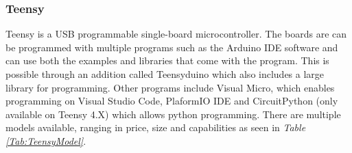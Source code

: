 \subsubsection{Teensy}

Teensy is a USB programmable single-board microcontroller.
The boards are can be programmed with multiple programs such as the Arduino IDE software and can use both the examples and libraries that come with the program.
This is possible through an addition called Teensyduino which also includes a large library for programming.
Other programs include Visual Micro, which enables programming on Visual Studio Code, PlaformIO IDE and CircuitPython (only available on Teensy 4.X) which allows python programming.
There are multiple models available, ranging in price, size and capabilities as seen in \textit{Table \ref{Tab:TeensyModel}}.


